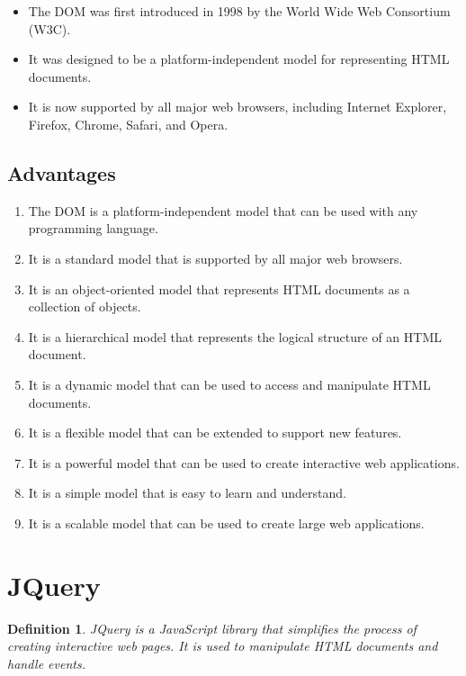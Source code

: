 \documentclass[11pt]{article}
\newtheorem{dfn}[thm]{Definition}
\begin{document}
\begin{itemize}
    \item The DOM was first introduced in 1998 by the World Wide Web Consortium (W3C).
    \item It was designed to be a platform-independent model for representing HTML documents.
    \item It is now supported by all major web browsers, including Internet Explorer, Firefox, Chrome, Safari, and Opera.

\end{itemize}


\subsection{Advantages}

\begin{enumerate}
    \item The DOM is a platform-independent model that can be used with any programming language.
    \item It is a standard model that is supported by all major web browsers.
    \item It is an object-oriented model that represents HTML documents as a collection of objects.
    \item It is a hierarchical model that represents the logical structure of an HTML document.
    \item It is a dynamic model that can be used to access and manipulate HTML documents.
    \item It is a flexible model that can be extended to support new features.
    \item It is a powerful model that can be used to create interactive web applications.
    \item It is a simple model that is easy to learn and understand.
    \item It is a scalable model that can be used to create large web applications.
\end{enumerate}

\section{JQuery}

\begin{dfn}
    JQuery is a JavaScript library that simplifies the process of creating interactive web pages. It is used to manipulate HTML documents and handle events.
\end{dfn}
\end{document}
